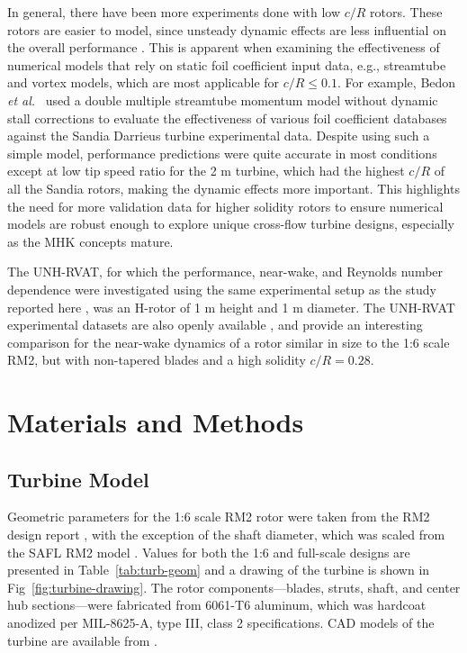 \documentclass[10pt,letterpaper]{article}
\begin{document}
In general, there have been more experiments done with low $c/R$ rotors. These
rotors are easier to model, since unsteady dynamic effects are less influential
on the overall performance \cite{Strickland1981}. This is apparent when
examining the effectiveness of numerical models that rely on static foil
coefficient input data, e.g., streamtube and vortex models, which are most
applicable for $c/R \leq 0.1$. For example, Bedon \emph{et al.}~\cite{Bedon2014}
used a double multiple streamtube momentum model without dynamic stall
corrections to evaluate the effectiveness of various foil coefficient databases
against the Sandia Darrieus turbine experimental data. Despite using such a
simple model, performance predictions were quite accurate in most conditions
except at low tip speed ratio for the 2 m turbine, which had the highest $c/R$
of all the Sandia rotors, making the dynamic effects more important. This
highlights the need for more validation data for higher solidity rotors to
ensure numerical models are robust enough to explore unique cross-flow turbine
designs, especially as the MHK concepts mature.

The UNH-RVAT, for which the performance, near-wake, and Reynolds number
dependence were investigated using the same experimental setup as the study
reported here \cite{Bachant2015-JoT, Bachant2016-Energies}, was an H-rotor of 1
m height and 1 m diameter. The UNH-RVAT experimental datasets are also openly
available \cite{Bachant2014-RVAT-baseline, Bachant2016-RVAT-Re-dep}, and provide
an interesting comparison for the near-wake dynamics of a rotor similar in size
to the 1:6 scale RM2, but with non-tapered blades and a high solidity $c/R =
0.28$.


\section*{Materials and Methods}

\subsection*{Turbine Model}

Geometric parameters for the 1:6 scale RM2 rotor were taken from the RM2 design
report \cite{Barone2011}, with the exception of the shaft diameter, which was
scaled from the SAFL RM2 model \cite{Hill2014}. Values for both the 1:6 and
full-scale designs are presented in Table~\ref{tab:turb-geom} and a drawing of
the turbine is shown in Fig~\ref{fig:turbine-drawing}. The rotor
components---blades, struts, shaft, and center hub sections---were fabricated
from 6061-T6 aluminum, which was hardcoat anodized per MIL-8625-A, type III,
class 2 specifications. CAD models of the turbine are available from
\cite{Bachant2015-RM2-CAD}.
\end{document}
